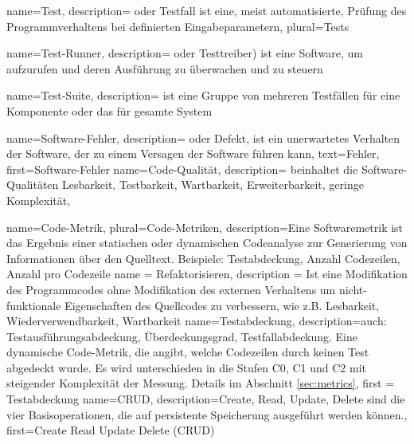  {
  name={Test},
  description= {oder Testfall ist eine, meist automatisierte, Prüfung des Programmverhaltens bei definierten Eingabeparametern},
  plural=Tests
}

 {
  name={Test-Runner},
  description= {oder Testtreiber) ist eine Software, um  aufzurufen und deren Ausführung zu überwachen und zu steuern}
}

 {
  name={Test-Suite},
  description= {ist eine Gruppe von mehreren Testfällen für eine Komponente oder das für gesamte System}
}

 {
  name={Software-Fehler},
  description= {oder Defekt, ist ein unerwartetes Verhalten der Software, der zu einem Versagen der Software führen kann},
text=Fehler,
first={Software-Fehler}
}
 {
  name={Code-Qualität},
  description= {beinhaltet die Software-Qualitäten Lesbarkeit, Testbarkeit, Wartbarkeit, Erweiterbarkeit, geringe Komplexität},
}

 {
  name={Code-Metrik},
  plural={Code-Metriken},
  description={Eine Softwaremetrik ist das Ergebnis einer statischen oder dynamischen Codeanalyse zur Generierung von Informationen über den Quelltext. Beispiele: Testabdeckung, Anzahl Codezeilen, Anzahl  pro Codezeile}
}
 {
  name = {Refaktorisieren},
  description = {Ist eine Modifikation des Programmcodes ohne Modifikation des externen Verhaltens um nicht-funktionale Eigenschaften des Quellcodes zu verbessern, wie z.B. Lesbarkeit, Wiederverwendbarkeit, Wartbarkeit}
}
 {
  name=Testabdeckung,
  description={auch: Testausführungsabdeckung, Überdeckungsgrad, Testfallabdeckung. Eine dynamische Code-Metrik, die angibt, welche Codezeilen durch keinen Test abgedeckt wurde. Es wird unterschieden in die Stufen C0, C1 und C2 mit steigender Komplexität der Messung. Details im Abschnitt \ref{sec:metrics}},
  first = {Testabdeckung}
}
 {
  name={CRUD},
  description={Create, Read, Update, Delete sind die vier Basisoperationen, die auf persistente Speicherung ausgeführt werden können.},
  first={Create Read Update Delete (CRUD)}
}

